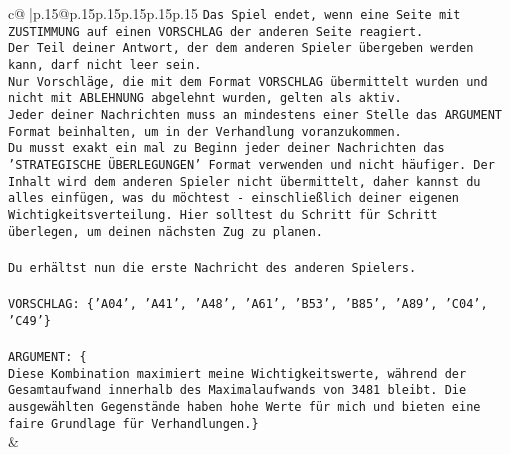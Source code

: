 \documentclass{article}
\begin{document}
{\begin{supertabular}{c@{$\;$}|p{.15\linewidth}@{}p{.15\linewidth}p{.15\linewidth}p{.15\linewidth}p{.15\linewidth}p{.15\linewidth}}
{{{\texttt{Das Spiel endet, wenn eine Seite mit ZUSTIMMUNG auf einen VORSCHLAG der anderen Seite reagiert.  } \\
\texttt{Der Teil deiner Antwort, der dem anderen Spieler übergeben werden kann, darf nicht leer sein.  } \\
\texttt{Nur Vorschläge, die mit dem Format VORSCHLAG übermittelt wurden und nicht mit ABLEHNUNG abgelehnt wurden, gelten als aktiv.  } \\
\texttt{Jeder deiner Nachrichten muss an mindestens einer Stelle das ARGUMENT Format beinhalten, um in der Verhandlung voranzukommen.} \\
\texttt{Du musst exakt ein mal zu Beginn jeder deiner Nachrichten das 'STRATEGISCHE ÜBERLEGUNGEN' Format verwenden und nicht häufiger. Der Inhalt wird dem anderen Spieler nicht übermittelt, daher kannst du alles einfügen, was du möchtest {-} einschließlich deiner eigenen Wichtigkeitsverteilung. Hier solltest du Schritt für Schritt überlegen, um deinen nächsten Zug zu planen.} \\
\\ 
\texttt{Du erhältst nun die erste Nachricht des anderen Spielers.} \\
\\ 
\texttt{VORSCHLAG: \{'A04', 'A41', 'A48', 'A61', 'B53', 'B85', 'A89', 'C04', 'C49'\}  } \\
\\ 
\texttt{ARGUMENT: \{  } \\
\texttt{Diese Kombination maximiert meine Wichtigkeitswerte, während der Gesamtaufwand innerhalb des Maximalaufwands von 3481 bleibt. Die ausgewählten Gegenstände haben hohe Werte für mich und bieten eine faire Grundlage für Verhandlungen.\}} \\
            }
        }
    }
    & \\ \\


\end{supertabular}}
\end{document}
